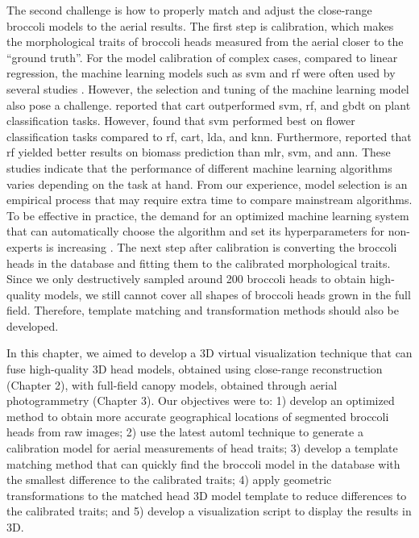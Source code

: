 The second challenge is how to properly match and adjust the close-range broccoli models to the aerial results. The first step is calibration, which makes the morphological traits of broccoli heads measured from the aerial closer to the ``ground truth''. For the model calibration of complex cases, compared to linear regression, the machine learning models such as \gls{svm} and \gls{rf} were often used by several studies \citep{nguyen_uav_2023, lu_assessment_2022}. However, the selection and tuning of the machine learning model also pose a challenge. \citet{wang_landscape_2019} reported that \gls{cart} outperformed \gls{svm}, \gls{rf}, and \gls{gbdt} on plant classification tasks. However, \citet{han_drone_2021} found that \gls{svm} performed best on flower classification tasks compared to \gls{rf}, \gls{cart}, \gls{lda}, and \gls{knn}. Furthermore, \citet{han_modeling_2019} reported that \gls{rf} yielded better results on biomass prediction than \gls{mlr}, \gls{svm}, and \gls{ann}. These studies indicate that the performance of different machine learning algorithms varies depending on the task at hand. From our experience, model selection is an empirical process that may require extra time to compare mainstream algorithms. To be effective in practice, the demand for an optimized machine learning system that can automatically choose the algorithm and set its hyperparameters for non-experts is increasing \citep{feurer_efficient_2015}. The next step after calibration is converting the broccoli heads in the database and fitting them to the calibrated morphological traits. Since we only destructively sampled around 200 broccoli heads to obtain high-quality models, we still cannot cover all shapes of broccoli heads grown in the full field. Therefore, template matching and transformation methods should also be developed.

In this chapter, we aimed to develop a 3D virtual visualization technique that can fuse high-quality 3D head models, obtained using close-range reconstruction (Chapter 2), with full-field canopy models, obtained through aerial photogrammetry (Chapter 3). Our objectives were to: 1) develop an optimized method to obtain more accurate geographical locations of segmented broccoli heads from raw images; 2) use the latest \gls{automl} technique to generate a calibration model for aerial measurements of head traits; 3) develop a template matching method that can quickly find the broccoli model in the database with the smallest difference to the calibrated traits; 4) apply geometric transformations to the matched head 3D model template to reduce differences to  the calibrated traits; and 5) develop a visualization script to display the results in 3D.


